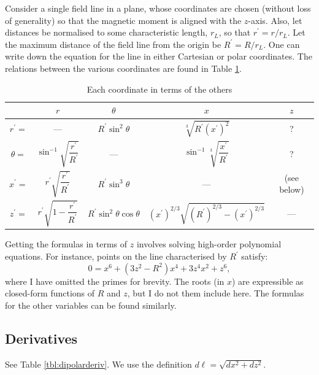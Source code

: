 \documentclass{book}
\begin{document}
Consider a single field line in a plane, whose coordinates are chosen (without loss of generality) so that the magnetic moment is aligned with the $z$-axis.
Also, let distances be normalised to some characteristic length, $r_L$, so that $r^\prime = r/r_L$.
Let the maximum distance of the field line from the origin be $R^\prime = R/r_L$.
One can write down the equation for the line in either Cartesian or polar coordinates.
The relations between the various coordinates are found in Table \ref{tbl:dipolar}.
\begin{table}[!ht]
    \centering
    \caption{Each coordinate in terms of the others}
    \label{tbl:dipolar}
    \begin{tabular}{c|cccc}
        & $r$ & $\theta$ & $x$ & $z$ \\[5pt]
        \hline
        $r^\prime =$ & --- & $R^\prime\sin^2\theta$ & $\sqrt[3]{R^\prime (x^\prime)^2}$ & ? \\[8pt]
        $\theta =$   & $\sin^{-1}\sqrt{\dfrac{r^\prime}{R^\prime}}$ & --- & $\sin^{-1}\sqrt[3]{\dfrac{x^\prime}{R^\prime}}$ & ? \\[8pt]
        $x^\prime =$ & $r^\prime\sqrt{\dfrac{r^\prime}{R^\prime}}$ & $R^\prime\sin^3\theta$ & --- & (see below) \\[8pt]
        $z^\prime =$ & $r^\prime\sqrt{1-\dfrac{r^\prime}{R^\prime}}$ & $R^\prime\sin^2\theta\cos\theta$ & $(x^\prime)^{2/3} \sqrt{(R^\prime)^{2/3} - (x^\prime)^{2/3}}$ & ---
    \end{tabular}
\end{table}

Getting the formulas in terms of $z$ involves solving high-order polynomial equations.
For instance, points on the line characterised by $R^\prime$ satisfy:
\begin{equation}
    0 = x^6 + (3z^2 - R^2)x^4 + 3z^4x^2 + z^6,
\end{equation}
where I have omitted the primes for brevity.
The roots (in $x$) are expressible as closed-form functions of $R$ and $z$, but I do not them include here.
The formulas for the other variables can be found similarly.

\subsection{Derivatives}

See Table \ref{tbl:dipolarderiv}.
We use the definition $d\ell = \sqrt{dx^2+dz^2}$.
\end{document}
